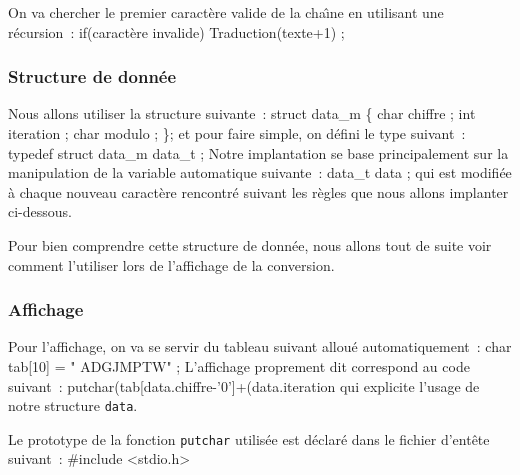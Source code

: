 \begin{correction}
\nwenddocs{}\nwdocspar
On va chercher le premier caract\`ere valide de la cha\^\i{}ne en utilisant 
une r\'ecursion~:
\nwenddocs{}\plusendmoddef
if(\LA{}caract\`ere invalide\RA{})
   Traduction(texte+1) ;
\eatline
\nwendcode{}\nwdocspar
\nwenddocs{}\nwdocspar
\subsubsection{Structure de donn\'ee}
Nous allons utiliser la structure suivante~:
\nwenddocs{}\endmoddef
struct data_m
\{
char chiffre ;
int iteration ;
char modulo ;
\};
\eatline
\nwendcode{}\nwdocspar
\nwenddocs{}\nwdocspar
et pour faire simple, on d\'efini le type suivant~:
\nwenddocs{}\plusendmoddef
typedef struct data_m data_t ;
\eatline
\nwendcode{}\nwdocspar
\nwenddocs{}\nwdocspar
Notre implantation se base principalement sur la manipulation de la variable
automatique suivante~:
\nwenddocs{}\endmoddef
data_t data ;
\eatline
\nwendcode{}qui est modifi\'ee \`a chaque nouveau caract\`ere rencontr\'e suivant
les r\`egles que nous allons implanter ci-dessous.

Pour bien comprendre cette structure de donn\'ee, nous allons tout de suite
voir comment l'utiliser lors de l'affichage de la conversion.

\nwenddocs{}\nwdocspar
\subsubsection*{Affichage}
Pour l'affichage, on va se servir du tableau suivant allou\'e automatiquement~:
\nwenddocs{}\plusendmoddef
char tab[10] = "  ADGJMPTW" ;
\eatline
\nwendcode{}\nwdocspar
L'affichage proprement dit correspond au code suivant~:
\nwenddocs{}\endmoddef
putchar(tab[data.chiffre-'0']+(data.iteration %
\eatline
\nwendcode{}qui explicite l'usage de notre structure {\tt{}data}.

\nwenddocs{}\nwdocspar
Le prototype de la fonction {\tt{}putchar} utilis\'ee est d\'eclar\'e 
dans le fichier d'ent\^ete suivant~:
\nwenddocs{}\endmoddef
#include <stdio.h>
\eatline
\nwendcode{}\nwdocspar

\end{correction}
